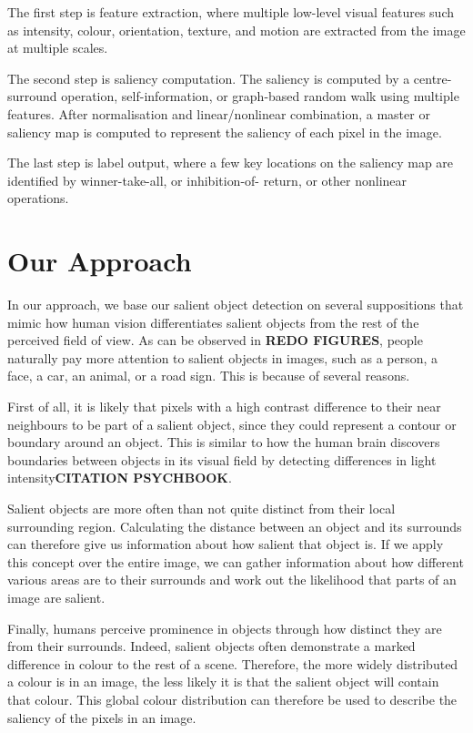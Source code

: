 \documentclass[10pt,twocolumn,letterpaper]{article}
\newcommand{\BOLD}{\textbf}
\begin{document}
The first step is feature extraction, where multiple low-level visual features such as intensity, colour, orientation, texture, and motion are extracted from the image at multiple scales.

The second step is saliency computation. The saliency is computed by a centre-surround operation, self-information, or graph-based random walk using multiple features. After normalisation and linear/nonlinear combination, a master or saliency map is computed to represent the saliency of each pixel in the image. 

The last step is label output, where a few key locations on the saliency map are identified by winner-take-all, or inhibition-of- return, or other nonlinear operations.

\section{Our Approach}
In our approach, we base our salient object detection on several suppositions that mimic how human vision differentiates salient objects from the rest of the perceived field of view.  As can be observed in \BOLD{REDO FIGURES}, people naturally pay more attention to salient objects in images, such as a person, a face, a car, an animal, or a road sign. This is because of several reasons.

First of all, it is likely that pixels with a high contrast difference to their near neighbours to be part of a salient object, since they could represent a contour or boundary around an object.  This is similar to how the human brain discovers boundaries between objects in its visual field by detecting differences in light intensity\BOLD{CITATION PSYCHBOOK}.

Salient objects are more often than not quite distinct from their local surrounding region.  Calculating the distance between an object and its surrounds can therefore give us information about how salient that object is.  If we apply this concept over the entire image, we can gather information about how different various areas are to their surrounds and work out the likelihood that parts of an image are salient.

Finally, humans perceive prominence in objects through how distinct they are from their surrounds.  Indeed, salient objects often demonstrate a marked difference in colour to the rest of a scene.  Therefore, the more widely distributed a colour is in an image, the less likely it is that the salient object will contain that colour.  This global colour distribution can therefore be used to describe the saliency of the pixels in an image.
\end{document}

